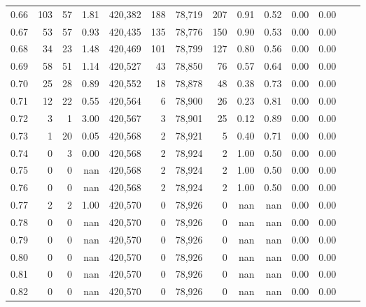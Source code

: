 \begin{tabular}{rrrrrrrrrrrrrr}
0.66 &     103 &     57 &    1.81 &  420,382 &      188 &  78,719 &     207 &  0.91 &  0.52 &  0.00 &      0.00 \\
0.67 &      53 &     57 &    0.93 &  420,435 &      135 &  78,776 &     150 &  0.90 &  0.53 &  0.00 &      0.00 \\
0.68 &      34 &     23 &    1.48 &  420,469 &      101 &  78,799 &     127 &  0.80 &  0.56 &  0.00 &      0.00 \\
0.69 &      58 &     51 &    1.14 &  420,527 &       43 &  78,850 &      76 &  0.57 &  0.64 &  0.00 &      0.00 \\
0.70 &      25 &     28 &    0.89 &  420,552 &       18 &  78,878 &      48 &  0.38 &  0.73 &  0.00 &      0.00 \\
0.71 &      12 &     22 &    0.55 &  420,564 &        6 &  78,900 &      26 &  0.23 &  0.81 &  0.00 &      0.00 \\
0.72 &       3 &      1 &    3.00 &  420,567 &        3 &  78,901 &      25 &  0.12 &  0.89 &  0.00 &      0.00 \\
0.73 &       1 &     20 &    0.05 &  420,568 &        2 &  78,921 &       5 &  0.40 &  0.71 &  0.00 &      0.00 \\
0.74 &       0 &      3 &    0.00 &  420,568 &        2 &  78,924 &       2 &  1.00 &  0.50 &  0.00 &      0.00 \\
0.75 &       0 &      0 &     nan &  420,568 &        2 &  78,924 &       2 &  1.00 &  0.50 &  0.00 &      0.00 \\
0.76 &       0 &      0 &     nan &  420,568 &        2 &  78,924 &       2 &  1.00 &  0.50 &  0.00 &      0.00 \\
0.77 &       2 &      2 &    1.00 &  420,570 &        0 &  78,926 &       0 &   nan &   nan &  0.00 &      0.00 \\
0.78 &       0 &      0 &     nan &  420,570 &        0 &  78,926 &       0 &   nan &   nan &  0.00 &      0.00 \\
0.79 &       0 &      0 &     nan &  420,570 &        0 &  78,926 &       0 &   nan &   nan &  0.00 &      0.00 \\
0.80 &       0 &      0 &     nan &  420,570 &        0 &  78,926 &       0 &   nan &   nan &  0.00 &      0.00 \\
0.81 &       0 &      0 &     nan &  420,570 &        0 &  78,926 &       0 &   nan &   nan &  0.00 &      0.00 \\
0.82 &       0 &      0 &     nan &  420,570 &        0 &  78,926 &       0 &   nan &   nan &  0.00 &      0.00 \\

\end{tabular}
